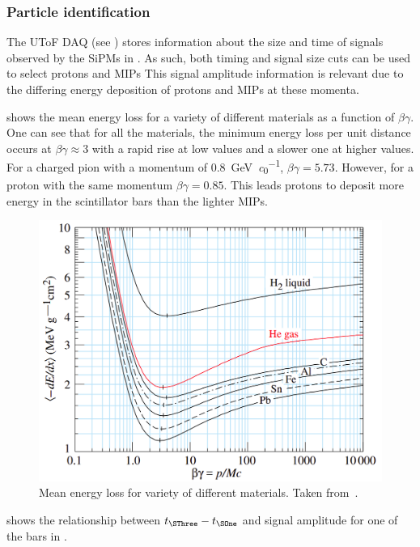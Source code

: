 \subsubsection{Particle identification}
\label{sec:hptpc_beam_flux:methods:s3:pid}

The UToF DAQ (see ) stores information about the size and time of signals observed by the SiPMs in \SThree.
As such, both timing and signal size cuts can be used to select protons and MIPs
This signal amplitude information is relevant due to the differing energy deposition of protons and MIPs at these momenta.

 shows the mean energy loss for a variety of different materials as a function of $\beta \gamma$.
One can see that for all the materials, the minimum energy loss per unit distance occurs at $\beta\gamma \approx 3$ with a rapid rise at low values and a slower one at higher values.
For a charged pion with a momentum of \SI{0.8}{\giga\electronvolt\per\clight}, $\beta\gamma = 5.73$.
However, for a proton with the same momentum $\beta\gamma = 0.85$.
This leads protons to deposit more energy in the scintillator bars than the lighter MIPs.


\begin{figure}[h]
  \centering
  \includegraphics[width=.6\linewidth]{files/figures/hptpc_beam_flux/energyLoss}
  \caption[Mean energy loss for a variety of different materials.]{Mean energy loss for variety of different materials. Taken from~\cite{pdg2020}.}
  \label{fig:energyLoss}
\end{figure}

 shows the relationship between $t_{\SThree} - t_{\SOne}$ and signal amplitude for one of the bars in \SThree.

